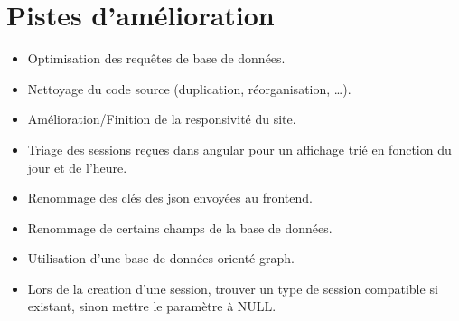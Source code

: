 \section{Pistes d'amélioration}
	\begin{itemize}
		\item Optimisation des requêtes de base de données.
		\item Nettoyage du code source (duplication, réorganisation, …).
		\item Amélioration/Finition de la responsivité du site.
		\item Triage des sessions reçues dans angular pour un affichage trié en fonction du jour et de l'heure.
		\item Renommage des clés des json envoyées au frontend.
		\item Renommage de certains champs de la base de données.
		\item Utilisation d'une base de données orienté graph.
		\item Lors de la creation d'une session, trouver un type de session compatible si existant, sinon mettre le paramètre à NULL. 
	\end{itemize}
